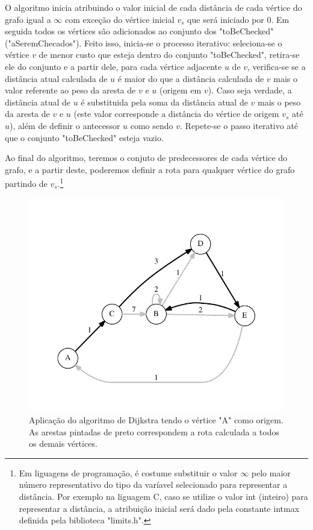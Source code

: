 O algoritmo inicia atribuindo o valor inicial de cada distância de cada vértice do grafo igual a $\infty$ com exceção do vértice inicial $v_{s}$ que será iniciado por 0. Em seguida todos os vértices são adicionados ao conjunto dos "toBeChecked" ("aSeremChecados"). Feito isso, inicia-se o processo iterativo: seleciona-se o vértice $v$ de menor custo que esteja dentro do conjunto "toBeChecked", retira-se ele do conjunto e a partir dele, para cada vértice adjacente $u$ de $v$, verifica-se se a distância atual calculada de $u$ é maior do que a distância calculada de $v$ mais o valor referente ao peso da aresta de $v$ e $u$ (origem em $v$). Caso seja verdade, a distância atual de $u$ é substituida pela soma da distância atual de $v$ mais o peso da aresta de $v$ e $u$ (este valor corresponde a distância do vértice de origem $v_{s}$ até $u$), além de definir o antecessor $u$ como sendo $v$. Repete-se o passo iterativo até que o conjunto "toBeChecked" esteja vazio.

Ao final do algoritmo, teremos o conjuto de predecessores de cada vértice do grafo, e a partir deste, poderemos definir a rota para qualquer vértice do grafo partindo de $v_{s}$.\footnote{Em liguagens de programação, é costume substituir o valor $\infty$ pelo maior número representativo do tipo da varíavel selecionado para representar a distância. Por exemplo na liguagem C, caso se utilize o valor int (inteiro) para representar a distância, a atribuição inicial será dado pela constante int\underline{\space}max  definida pela biblioteca "limits.h".}

\begin{figure}[H]
\centering
\includegraphics[width=1.\textwidth]{figuras/grafo-dijkstra} 
\caption{Aplicação do algoritmo de Dijkstra tendo o vértice "A" como origem. As arestas pintadas de preto correspondem a rota calculada a todos os demais vértices.}
\label{fig-dijkstra-algoritmo-grafo}
\end{figure}


